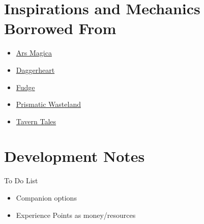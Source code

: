 \documentclass[titlepage]{article}
\title{\MakeUppercase{\thetitle}}
\author{Aaron Councilman}
\date{\theversion}
\begin{document}
\begin{titlepage}
\maketitle
\end{titlepage}

\tableofcontents

\newpage









\clearpage
\printindex

\clearpage
\appendix
\section{Inspirations and Mechanics Borrowed From}
\begin{itemize}
  \item[-] \href{https://atlas-games.com/arsmagica}{Ars Magica}
  \item[-] \href{https://www.daggerheart.com}{Daggerheart}
  \item[-] \href{https://www.fudgerpg.com/}{Fudge}
  \item[-] \href{https://www.prismaticwasteland.com/blog/bury-your-gold-on-abstract-wealth}{Prismatic Wasteland}
  \item[-] \href{https://taverntalesrpg.weebly.com/}{Tavern Tales}
\end{itemize}

\section{Development Notes}
To Do List
\begin{itemize}
  \item[-] Companion options
  \item[-] Experience Points as money/resources
\end{itemize}
\end{document}
